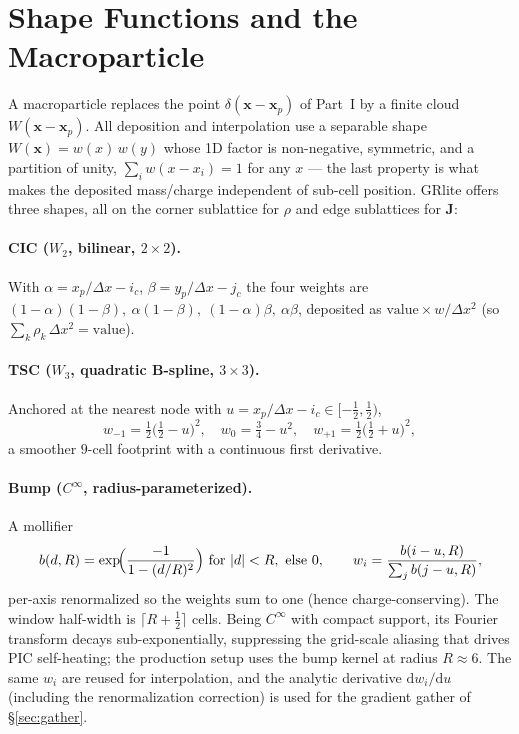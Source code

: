 \documentclass[11pt]{article}
\newcommand{\vv}[1]{\mathbf{#1}}           %
\newcommand{\dd}{\mathrm{d}}               %
\newcommand{\dx}{\Delta x}                 %
\begin{document}
\section{Shape Functions and the Macroparticle}
\label{sec:shapes}

A macroparticle replaces the point $\delta(\vv{x}-\vv{x}_p)$ of Part~I by a
finite cloud $W(\vv{x}-\vv{x}_p)$. All deposition and interpolation use a
separable shape $W(\vv{x})=w(x)\,w(y)$ whose 1D factor is non-negative,
symmetric, and a partition of unity, $\sum_i w(x-x_i)=1$ for any $x$ --- the
last property is what makes the deposited mass/charge independent of sub-cell
position. GRlite offers three shapes, all on the corner sublattice for $\rho$
and edge sublattices for $\vv J$:

\paragraph{CIC ($W_2$, bilinear, $2{\times}2$).} With
$\alpha=x_p/\dx-i_c$, $\beta=y_p/\dx-j_c$ the four weights are
$(1{-}\alpha)(1{-}\beta),\ \alpha(1{-}\beta),\ (1{-}\alpha)\beta,\ \alpha\beta$,
deposited as $\mathrm{value}\times w/\dx^2$ (so $\sum_k\!\rho_k\,\dx^2=\mathrm{value}$).

\paragraph{TSC ($W_3$, quadratic B-spline, $3{\times}3$).} Anchored at the
nearest node with $u=x_p/\dx-i_c\in[-\tfrac12,\tfrac12)$,
\begin{equation}
  w_{-1}=\tfrac12\bigl(\tfrac12-u\bigr)^2,\quad
  w_{0}=\tfrac34-u^2,\quad
  w_{+1}=\tfrac12\bigl(\tfrac12+u\bigr)^2 ,
\end{equation}
a smoother $9$-cell footprint with a continuous first derivative.

\paragraph{Bump ($C^\infty$, radius-parameterized).} A mollifier
\begin{equation}
\label{eq:bump}
  b(d,R)=\exp\!\Bigl(\frac{-1}{1-(d/R)^2}\Bigr)\ \text{for }|d|<R,\ \text{else }0,
  \qquad w_i = \frac{b(i-u,R)}{\sum_j b(j-u,R)},
\end{equation}
per-axis renormalized so the weights sum to one (hence charge-conserving). The
window half-width is $\lceil R+\tfrac12\rceil$ cells. Being $C^\infty$ with
compact support, its Fourier transform decays sub-exponentially, suppressing the
grid-scale aliasing that drives PIC self-heating; the production setup uses the
bump kernel at radius $R\approx6$. The same $w_i$ are reused for interpolation,
and the analytic derivative $\dd w_i/\dd u$ (including the renormalization
correction) is used for the gradient gather of \S\ref{sec:gather}.
\end{document}
